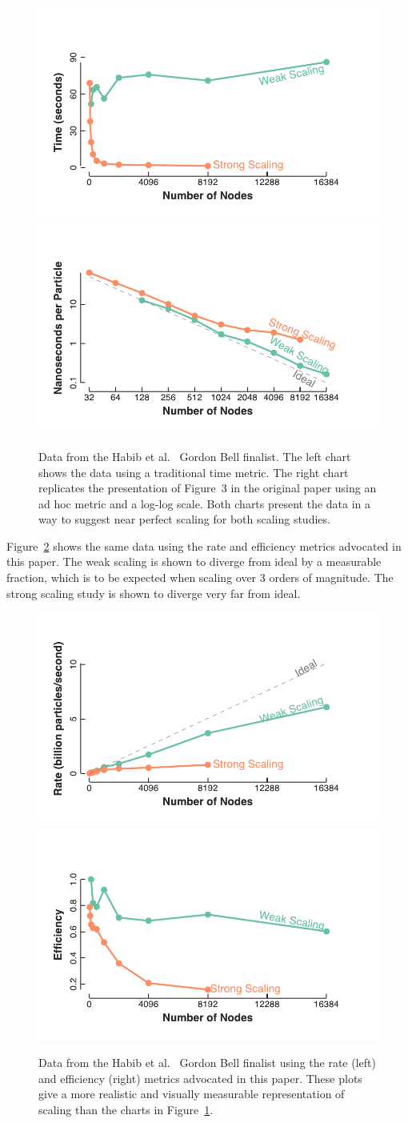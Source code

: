 \documentclass{llncs}
\newcommand*{\scite}[1]{~\cite{#1}}
\newcommand{\etal}{et al.\xspace}
\begin{document}
\begin{figure}[htb]
  \centering
  \includegraphics[width=.48\linewidth]{images/HabibTime}\quad
  \includegraphics[width=.48\linewidth]{images/HabibTimePerParticle}
  \caption{Data from the Habib \etal\scite{Habib2013} Gordon Bell
    finalist. The left chart shows the data using a traditional time
    metric. The right chart replicates the presentation of Figure~3 in the
    original paper using an ad hoc metric and a log-log
    scale. Both charts present the data in a way to suggest near perfect
    scaling for both scaling studies.}
  \label{fig:HabibTraditional}
\end{figure}

Figure~\ref{fig:HabibBetter} shows the same data using the rate and
efficiency metrics advocated in this paper. The weak scaling is shown to
diverge from ideal by a measurable fraction, which is to be expected when
scaling over 3 orders of magnitude. The strong scaling study is shown to
diverge very far from ideal.

\begin{figure}[htb]
  \centering
  \includegraphics[width=.48\linewidth]{images/HabibRate}\quad
  \includegraphics[width=.48\linewidth]{images/HabibEfficiency}
  \caption{Data from the Habib \etal\scite{Habib2013} Gordon Bell finalist
    using the rate (left) and efficiency (right) metrics advocated in this
    paper. These plots give a more realistic and visually measurable
    representation of scaling than the charts in
    Figure~\ref{fig:HabibTraditional}.}
  \label{fig:HabibBetter}
\end{figure}
\end{document}
